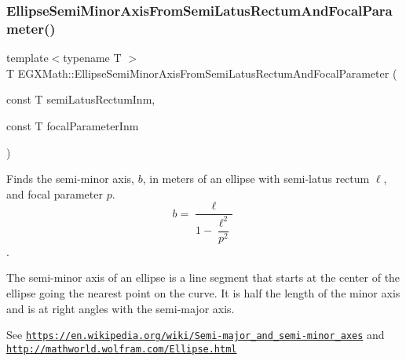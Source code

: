 \mbox{\label{group___e_g_x_math-_geometry-2_d-_ellipse-_semi_minor_axis_gafe27ed64ba521ec3cf8557520cbc6a14}} 
\subsubsection{\texorpdfstring{Ellipse\+Semi\+Minor\+Axis\+From\+Semi\+Latus\+Rectum\+And\+Focal\+Parameter()}{EllipseSemiMinorAxisFromSemiLatusRectumAndFocalParameter()}}
{\footnotesize\ttfamily template$<$typename T $>$ \\
T E\+G\+X\+Math\+::\+Ellipse\+Semi\+Minor\+Axis\+From\+Semi\+Latus\+Rectum\+And\+Focal\+Parameter (\begin{DoxyParamCaption}\item[{const T}]{semi\+Latus\+Rectum\+Inm,  }\item[{const T}]{focal\+Parameter\+Inm }\end{DoxyParamCaption})}



Finds the semi-\/minor axis, $b$, in meters of an ellipse with semi-\/latus rectum $\ell$, and focal parameter $p$. \[ b=\dfrac{\ell}{1-\dfrac{\ell^2}{p^2}} \]. 

The semi-\/minor axis of an ellipse is a line segment that starts at the center of the ellipse going the nearest point on the curve. It is half the length of the minor axis and is at right angles with the semi-\/major axis.

See \href{https://en.wikipedia.org/wiki/Semi-major_and_semi-minor_axes}{\tt https\+://en.\+wikipedia.\+org/wiki/\+Semi-\/major\+\_\+and\+\_\+semi-\/minor\+\_\+axes} and \href{http://mathworld.wolfram.com/Ellipse.html}{\tt http\+://mathworld.\+wolfram.\+com/\+Ellipse.\+html}


